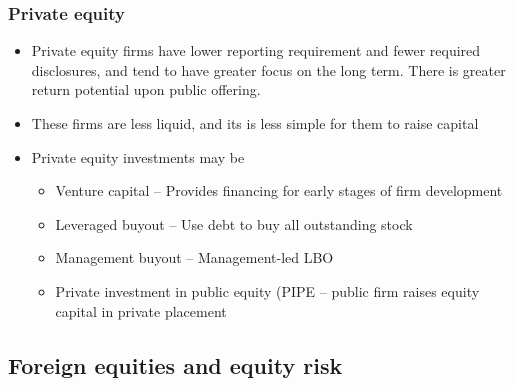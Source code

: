 \documentclass[../notes_compiled.tex]{subfiles}
\begin{document}
\subsubsection{Private equity}
\begin{itemize}
\item Private equity firms have lower reporting requirement and fewer required disclosures, and tend to have greater focus on the long term. There is greater return potential upon public offering. 
\item These firms are less liquid, and its is less simple for them to raise capital
\item Private equity investments may be
\begin{itemize}
\item Venture capital -- Provides financing for early stages of firm development
\item Leveraged buyout -- Use debt to buy all outstanding stock
\item Management buyout -- Management-led LBO
\item Private investment in public equity (PIPE -- public firm raises equity capital in private placement

\end{itemize}

\end{itemize}

\subsection{Foreign equities and equity risk}
\end{document}
